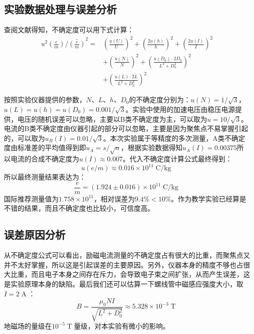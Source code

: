 \documentclass{WHUReport}
\begin{document}
\begin{multicols}{2}
	\section{实验数据处理与误差分析}
	查阅文献得知，不确定度可以用下式计算：
	\begin{equation}
		\begin{aligned}
			u^2(\frac{e}{m})/\bar{\left(\frac{e}{m}\right)}^2=&\left(\frac{u(U)}{U}\right)^2+\left(\frac{2u(h)}{h}\right)^2+\left(\frac{2u(I)}{I}\right)^2\\&+\left(\frac{u(N)}{N}\right)^2+\left(\frac{u(D_0)\cdot 2D_0}{L^2+D_0^2}\right)^2\\&+\left(\frac{u(L)\cdot 2L}{L^2+D_0^2}\right)^2
		\end{aligned}
	\end{equation}
	
	按照实验仪器提供的参数，$N$、$L$、$h$、$D_0$的不确定度分别为：$u(N)=1/\sqrt{3}$，$u(L)=u(h)=u(D_0)=0.001/\sqrt{3}$。实验中使用的加速电压由稳压电源提供，电压的随机误差可以忽略，主要以B类不确定度为主，可以取为$u=10/\sqrt{3}$。电流的B类不确定度由仪器引起的部分可以忽略，主要是因为聚焦点不易掌握引起的，可以取为$u_B(I)=0.01/\sqrt{3}$。本次实验属于等精度的多次测量，A类不确定度由标准差的平均值得到即$u_A=s/\sqrt{n}$，根据实验数据得知$u_A(I)=0.00375$所以电流的合成不确定度为$u(I)\approx 0.007$。代入不确定度计算公式最终得到：
	\begin{equation}
		u(e/m)\approx 0.016\times 10^{11} \operatorname{C/kg}
	\end{equation}
	所以最终测量结果表达为：
	\begin{equation}
		\frac{e}{m}=\left(1.924\pm0.016\right)\times 10^{11} \operatorname{C/kg}
	\end{equation}
	国际推荐测量值为$1.758\times 10^11$，相对误差为$9.4\%<10\%$。作为教学实验已经算是不错的结果，而且不确定度也比较小，可信度高。
	
	\subsection{误差原因分析}
	从不确定度公式可以看出，励磁电流测量的不确定度占有很大的比重，而聚焦点又并不太好掌握，所以这是引起误差的主要原因。另外，仪器本身的精度不够也占很大比重，而且电子本身之间存在斥力，会导致电子束之间扩张，从而产生误差，这是实验原理本身的缺陷。最后我们还可以估算一下螺线管中磁感应强度大小，取$I=2\operatorname{A}$：
	\begin{equation}
		B=\frac{\mu_0 N I}{\sqrt{L^2+D_0^2}}\approx 5.328\times 10^{-3}\operatorname{T}
	\end{equation}
	地磁场的量级在$10^{-5}\operatorname{T}$量级，对本实验有微小的影响。

\end{multicols}
\end{document}
